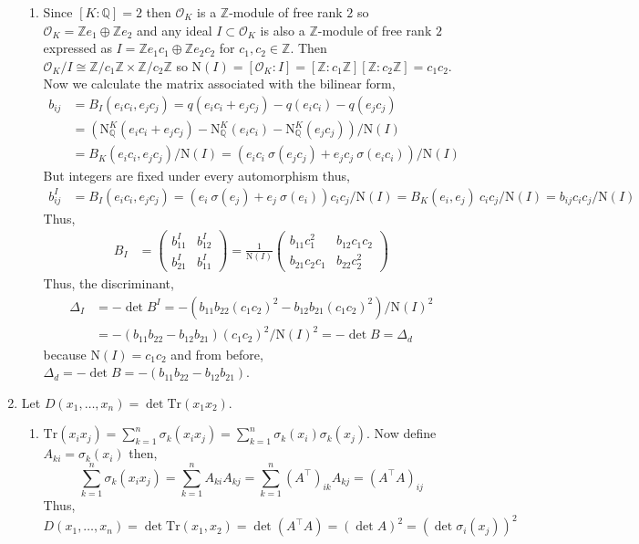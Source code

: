 \documentclass[12pt]{extarticle}
\newcommand{\Z}{\mathbb{Z}}
\newcommand{\Q}{\mathbb{Q}}
\newcommand{\ints}[1]{\mathcal{O}_{#1}}
\newcommand{\qnorm}[2]{\mathrm{N}^{#1}_{\Q}\left(#2\right)}
\newcommand{\inorm}[1]{\mathrm{N}(#1)}
\newcommand{\tr}[1]{\mathrm{Tr} \! \left(#1\right)}
\begin{document}
\begin{enumerate}
\begin{enumerate}
\item Since $[K : \Q] = 2$ then $\ints{K}$ is a $\Z$-module of free rank $2$ so $\ints{K} = \Z e_1 \oplus \Z e_2$ and any ideal $I \subset \ints{K}$ is also a $\Z$-module of free rank $2$ expressed as $I = \Z e_1 c_1 \oplus \Z e_2 c_2$ for $c_1, c_2 \in \Z$. Then $\ints{K}/I \cong \Z/c_1 \Z \times \Z / c_2 \Z$ so $\inorm{I} = [\ints{K} : I] = [\Z : c_1 \Z] [\Z : c_2 \Z] = c_1 c_2$. Now we calculate the matrix associated with the bilinear form,
\begin{align*}
b_{ij} &= B_I(e_i c_i, e_j c_j) = q(e_i c_i + e_j c_j) - q(e_i c_i) - q(e_j c_j) \\ &= (\qnorm{K}{e_i c_i + e_j c_j} - \qnorm{K}{e_i c_i} - \qnorm{K}{e_j c_j})/\inorm{I}  \\
&= B_K(e_i c_i, e_j c_j)/\inorm{I} = (e_i c_i \: \sigma(e_j c_j) + e_j c_j \: \sigma(e_i c_i))/ \inorm{I} 
\end{align*}
But integers are fixed under every automorphism thus,
\begin{align*}
b_{ij}^I &= B_I(e_i c_i, e_j c_j) = (e_i \:\sigma(e_j) + e_j\: \sigma(e_i)) c_i c_j/ \inorm{I}  = B_K(e_i, e_j) \: c_i c_j /\inorm{I} = b_{ij} c_i c_j /\inorm{I}
\end{align*}
Thus, \begin{align*} B_I &= 
\begin{pmatrix}
b_{11}^I & b_{12}^I \\
b_{21}^I & b_{11}^I			
\end{pmatrix} = \frac{1}{\inorm{I}}
\begin{pmatrix}
b_{11} c_1^2 & b_{12} c_1 c_2 \\
b_{21} c_2 c_1 & b_{22} c_2^2		
\end{pmatrix} 
\end{align*}
Thus, the discriminant, 
\begin{align*}
\Delta_I &= - \det{B^I} = - (b_{11} b_{22} (c_1 c_2)^2 - b_{12} b_{21} (c_1 c_2)^2)/ \inorm{I}^2 \\ &= -(b_{11} b_{22} - b_{12} b_{21}) (c_1 c_2)^2 / \inorm{I}^2 = - \det{B} = \Delta_d
\end{align*}
because $\inorm{I} = c_1 c_2$ and from before, $\Delta_d = -\det{B} = -(b_{11} b_{22} - b_{12} b_{21})$.

\end{enumerate}

\item Let $D(x_1, \dots, x_n) = \det{\tr{x_1x_2}}$.

\begin{enumerate}
\item $\tr{x_i x_j} = \sum\limits_{k = 1}^n \sigma_k (x_i x_j) = \sum\limits_{k = 1}^n \sigma_k (x_i) \sigma_k(x_j)$. Now define $A_{ki} = \sigma_k(x_i)$ then, \[\sum\limits_{k = 1}^n \sigma_k (x_i x_j) = \sum\limits_{k = 1}^n A_{ki} A_{kj} = \sum\limits_{k = 1}^n (A^\top)_{ik} A_{kj} = (A^\top A)_{ij}\] Thus, \[D(x_1, \dots, x_n) = \det{\tr{x_1, x_2}} = \det{(A^\top A)} = (\det{A})^2 = (\det{\sigma_i(x_j)})^2\]


\end{enumerate}
\end{enumerate}
\end{document}
